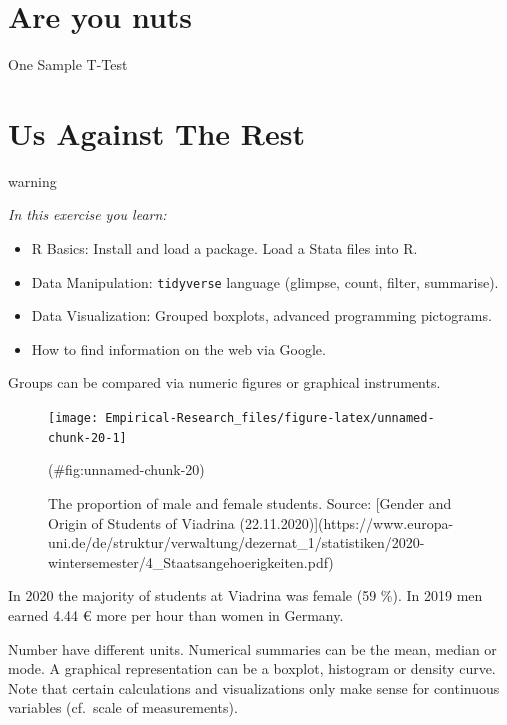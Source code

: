 \documentclass[
]{book}
\providecommand{\tightlist}{%
  \setlength{\itemsep}{0pt}\setlength{\parskip}{0pt}}
\begin{document}
\hypertarget{are-you-nuts}{%
\chapter{Are you nuts}\label{are-you-nuts}}

One Sample T-Test

\hypertarget{us-against-the-rest}{%
\chapter{Us Against The Rest}\label{us-against-the-rest}}

\begin{infobox2}warning

\emph{In this exercise you learn:}

\begin{itemize}
\tightlist
\item
  R Basics: Install and load a package. Load a Stata files into R.
\item
  Data Manipulation: \texttt{tidyverse} language (glimpse, count, filter, summarise).
\item
  Data Visualization: Grouped boxplots, advanced programming pictograms.
\item
  How to find information on the web via Google.
\end{itemize}

\end{infobox2}

Groups can be compared via numeric figures or graphical instruments.

\begin{figure}

{\centering \texttt{[image: Empirical-Research\_files/figure-latex/unnamed-chunk-20-1]} 

}

\caption{\label{fig:challenge} The proportion of male and female students. Source: [Gender and Origin of Students of Viadrina (22.11.2020)](https://www.europa-uni.de/de/struktur/verwaltung/dezernat_1/statistiken/2020-wintersemester/4_Staatsangehoerigkeiten.pdf) }(\#fig:unnamed-chunk-20)
\end{figure}

In 2020 the majority of students at Viadrina was female (59 \%). In 2019 men earned 4.44 € more per hour than women in Germany.

Number have different units. Numerical summaries can be the mean, median or mode. A graphical representation can be a boxplot, histogram or density curve. Note that certain calculations and visualizations only make sense for continuous variables (cf.~scale of measurements).
\end{document}
